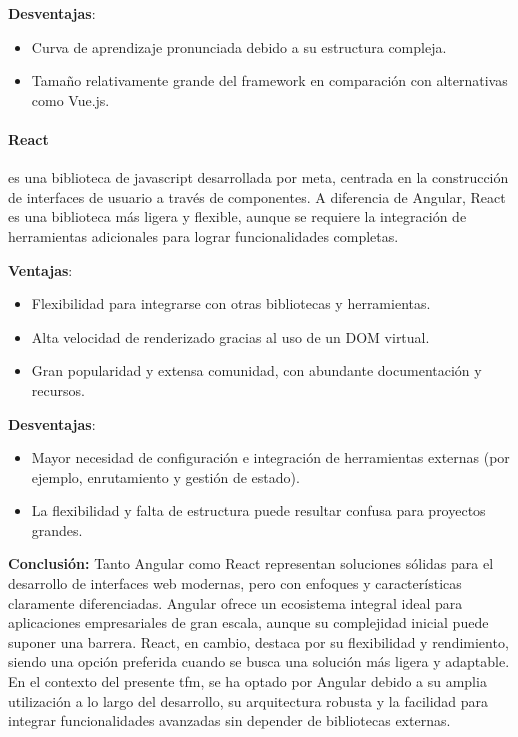 \textbf{Desventajas}:
\begin{itemize}
    \item Curva de aprendizaje pronunciada debido a su estructura compleja.
    \item Tamaño relativamente grande del \gls{framework} en comparación con alternativas como Vue.js.
\end{itemize}

\paragraph{React~\cite{react}} es una biblioteca de \gls{javascript} desarrollada por \gls{meta}, centrada en la construcción de interfaces de usuario a través de componentes. A diferencia de Angular, React es una biblioteca más ligera y flexible, aunque se requiere la integración de herramientas adicionales para lograr funcionalidades completas.

\textbf{Ventajas}:
\begin{itemize}
    \item Flexibilidad para integrarse con otras bibliotecas y herramientas.
    \item Alta velocidad de renderizado gracias al uso de un DOM virtual.
    \item Gran popularidad y extensa comunidad, con abundante documentación y recursos.
\end{itemize}

\textbf{Desventajas}:
\begin{itemize}
    \item Mayor necesidad de configuración e integración de herramientas externas (por ejemplo, enrutamiento y gestión de estado).
    \item La flexibilidad y falta de estructura puede resultar confusa para proyectos grandes.
\end{itemize}
\textbf{Conclusión:} Tanto Angular como React representan soluciones sólidas para el desarrollo de interfaces web modernas, pero con enfoques y características claramente diferenciadas. Angular ofrece un ecosistema integral ideal para aplicaciones empresariales de gran escala, aunque su complejidad inicial puede suponer una barrera. React, en cambio, destaca por su flexibilidad y rendimiento, siendo una opción preferida cuando se busca una solución más ligera y adaptable. En el contexto del presente \gls{tfm}, se ha optado por Angular debido a su amplia utilización a lo largo del desarrollo, su arquitectura robusta y la facilidad para integrar funcionalidades avanzadas sin depender de bibliotecas externas.


